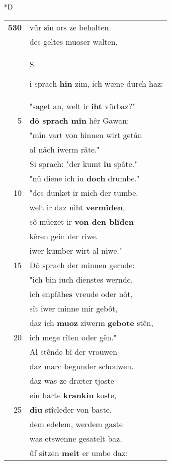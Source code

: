 \documentclass[8pt,a4paper,notitlepage]{article}
\begin{document}
\begin{table}[ht]
\begin{minipage}[t]{0.5\linewidth}
\small
\begin{center}*D
\end{center}
\begin{tabular}{rl}
\textbf{530} & vür sîn ors ze behalten.\\ 
 & des geltes muoser walten.\\ 
 & \begin{large}S\end{large}i sprach \textbf{hin} zim, ich wæne durch haz:\\ 
 & "saget an, welt ir \textbf{iht} vürbaz?"\\ 
5 & \textbf{dô sprach mîn} hêr Gawan:\\ 
 & "mîn vart von hinnen wirt getân\\ 
 & al nâch iwerm râte."\\ 
 & Si sprach: "der kumt \textbf{iu} spâte."\\ 
 & "nû diene ich iu \textbf{doch} drumbe."\\ 
10 & "des dunket ir mich der tumbe.\\ 
 & welt ir daz niht \textbf{vermîden},\\ 
 & sô müezet ir \textbf{von den blîden}\\ 
 & kêren gein der riwe.\\ 
 & iwer kumber wirt al niwe."\\ 
15 & Dô sprach der minnen gernde:\\ 
 & "ich bin iuch dienstes wernde,\\ 
 & ich enpfâhe\textbf{s} vreude oder nôt,\\ 
 & sît iwer minne mir gebôt,\\ 
 & daz ich \textbf{muoz} ziwerm \textbf{gebote} stên,\\ 
20 & ich mege rîten oder gên."\\ 
 & Al stênde bî der vrouwen\\ 
 & daz marc begunder schouwen.\\ 
 & daz was ze dræter tjoste\\ 
 & ein harte \textbf{krankiu} koste,\\ 
25 & \textbf{diu} stîcleder von baste.\\ 
 & dem edelem, werdem gaste\\ 
 & was etswenne gesatelt baz.\\ 
 & ûf sitzen \textbf{meit} er umbe daz:\\ 

\end{tabular}
\end{minipage}
\end{table}
\end{document}
